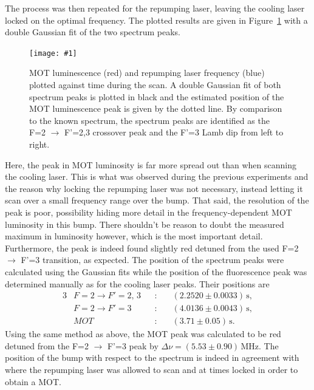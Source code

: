 \documentclass[twocolumn]{article}
\newcommand{\insertFigure}[1]{%
   \texttt{[image: \#1]}%
}
\begin{document}
\par The process was then repeated for the repumping laser, leaving the cooling laser locked on the optimal frequency. The plotted results are given in Figure~\ref{fig:det} with a double Gaussian fit of the two spectrum peaks.
\begin{figure} [!h]
	\centering
	\insertFigure{Images/Detuning2.png}
	\caption{MOT luminescence (red) and repumping laser frequency (blue) plotted against time during the scan. A double Gaussian fit of both spectrum peaks is plotted in black and the estimated position of the MOT luminescence peak is given by the dotted line. By comparison to the known spectrum, the spectrum peaks are identified as the F=2 $\to$ F'=2,3 crossover peak and the F'=3 Lamb dip from left to right.}
	\label{fig:det}
\end{figure}
Here, the peak in MOT luminosity is far more spread out than when scanning the cooling laser. This is what was observed during the previous experiments and the reason why locking the repumping laser was not necessary, instead letting it scan over a small frequency range over the bump. That said, the resolution of the peak is poor, possibility hiding more detail in the frequency-dependent MOT luminosity in this bump. There shouldn't be reason to doubt the measured maximum in luminosity however, which is the most important detail. Furthermore, the peak is indeed found slightly red detuned from the used F=2 $\to$ F'=3 transition, as expected. The position of the spectrum peaks were calculated using the Gaussian fits while the position of the fluorescence peak was determined manually as for the cooling laser peaks. Their positions are
\begin{alignat*}{3}
&F = 2 \rightarrow F'=2, \, 3&&: \hspace{12pt} &(2.2520 \pm 0.0033) \, \text{s},\\
&F=2 \rightarrow F'=3 &&:  &(4.0136 \pm 0.0043) \, \text{s},\\
&MOT			&&:		&(3.71 \pm 0.05) \, \text{s}.
\end{alignat*}
Using the same method as above, the MOT peak was calculated to be red detuned from the F=2 $\to$ F'=3 peak by $\Delta \nu = (5.53 \pm 0.90)\, \text{MHz}$. The position of the bump with respect to the spectrum is indeed in agreement with where the repumping laser was allowed to scan and at times locked in order to obtain a MOT.
\end{document}
